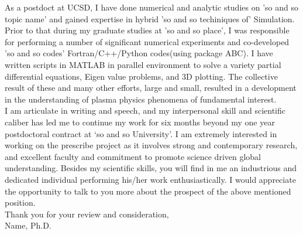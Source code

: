 \documentclass[11pt,a4paper]{revtex4-1}
\begin{document}
As a postdoct at UCSD, I have  done numerical and analytic studies on 'so and so topic name' and  gained expertise in hybrid 'so and so techiniques of' Simulation. \\
Prior to that during my graduate studies at 'so and so place', I was responsible for performing a number of significant numerical 
experiments and co-developed 'so and so codes'  Fortran/C++/Python codes(using package ABC). I have written scripts in MATLAB in parallel 
environment to solve a variety partial differential equations, Eigen value problems,  and 3D plotting.
The collective result of these and many other efforts, large and small, resulted in a development in the understanding of plasma physics phenomena of fundamental interest. \\
I am articulate in writing and speech, and my interpersonal skill and scientific caliber has led me to continue my work 
for six months beyond my one year postdoctoral contract at `so and so University'. 
  I am extremely interested in working on the prescribe project as it involves strong and contemporary research,
   and excellent faculty and commitment to promote science driven global understanding. 
Besides my scientific skills, you will find in me an industrious and dedicated individual  performing his/her work  enthusiastically. 
 I would appreciate the opportunity to talk to you more about the prospect of the above mentioned position. \\
 Thank you for your review and consideration, \\
Name, Ph.D.
\end{document}
